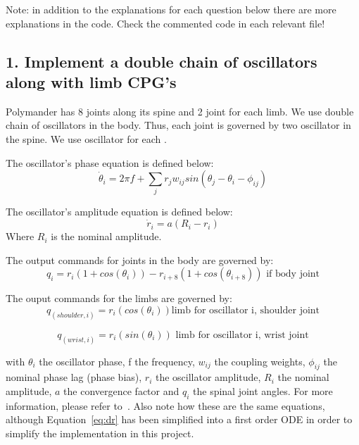 \documentclass{cmc}
\begin{document}
Note: in addition to the explanations for each question below there are more explanations in the code.
Check the commented code in each relevant file!


\subsection*{1. Implement a double chain of oscillators along with
  limb CPG's}\label{sec:implement-chain}

Polymander has 8 joints along its spine and 2 joint for each
limb. We use double chain of oscillators in the body. Thus, each joint is
governed by two oscillator in the spine. We use  oscillator for each .

The oscillator's phase equation is defined below:
\begin{equation}
  \label{eq:dphase}
  \dot{\theta}_i = 2 \pi f + \sum_j r_j w_{ij} sin(\theta_j - \theta_i - \phi_{ij})
\end{equation}

The oscillator's amplitude equation is defined below:
\begin{equation}
  \label{eq:dr}
  \dot{r}_i = a (R_i - r_i)
\end{equation}
Where $ R_i $ is the nominal amplitude.

The output commands for joints in the body are governed by:
\begin{equation}
  \label{eq:output_body}
  q_i = r_i(1 + cos(\theta_i)) - r_{i+8}(1 + cos(\theta_{i+8})) \text{ if body joint}
\end{equation}

The ouput commands for the limbs are governed by:
\begin{equation}
  \label{eq:output_l1}
  q_{(shoulder, i)} = r_i(cos(\theta_i)) \text{limb for oscillator i, shoulder joint}
\end{equation}

\begin{equation}
  \label{eq:output_l2}
  q_{(wrist, i)} = r_i(sin(\theta_i)) \text{ limb for oscillator i, wrist joint}
\end{equation}


with $ \theta_i $ the oscillator phase, f the frequency, $ w_{ij} $ the coupling
weights, $ \phi_{ij} $ the nominal phase lag (phase bias), $ r_i $ the
oscillator amplitude, $ R_i $ the nominal amplitude, $ a $ the convergence
factor and $ q_i $ the spinal joint angles. For more information, please refer
to~\cite{ijspeert2007swimming}. Also note how these are the same equations,
although Equation~\ref{eq:dr} has been simplified into a first order ODE in
order to simplify the implementation in this project.
\end{document}

